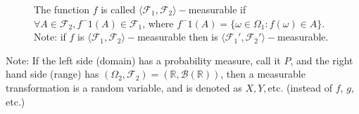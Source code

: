 \documentclass[11pt]{article}
\theoremstyle{definition}
\begin{document}
\begin{figure}[htbp]
\centering
\setlength{\fboxrule}{.75pt}

\begin{minipage}[t]{0.45\linewidth}\centering
{}
\caption*{$(\Omega_1, \mathcal{F}_1, \mu_1)$, $\mathcal{F}_1 \subseteq \mathcal{F}_1'$}
\end{minipage}
\hfill
\begin{minipage}[t]{0.45\linewidth}\centering
{}
\caption*{$(\Omega_2, \mathcal{F}_2, \mu_2)$, $\mathcal{F}_2' \subseteq \mathcal{F}_2$}
\end{minipage}

\caption{The function $f$ is called $\langle \mathcal{F}_1, \mathcal{F}_2\rangle-$measurable if $\forall A \in \mathcal{F}_2, f^-1(A) \in \mathcal{F}_1$, where $f^-1(A) = \{\omega \in \Omega_1: f(\omega) \in A\}.$ Note: if $f$ is $\langle \mathcal{F}_1, \mathcal{F}_2\rangle-$measurable then is $\langle \mathcal{F}_1', \mathcal{F}_2'\rangle-$measurable.}
\end{figure}
\noindent
Note: If the left side (domain) has a probability measure, call it $P$, and the right hand side (range) has $(\Omega_2, \mathcal{F}_2) = (\mathbb{R}, \mathcal{B}(\mathbb{R}))$, then a measurable transformation is a random variable, and is denoted as $X, Y,$etc. (instead of $f$, $g$, etc.)
\\
\end{document}
